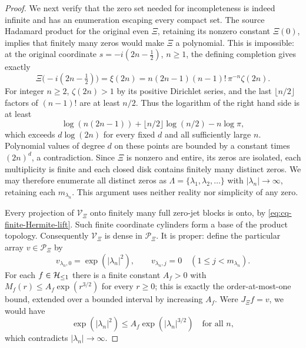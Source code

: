\begin{proof}
We next verify that the zero set needed for incompleteness is
indeed infinite and has an enumeration escaping every compact
set. The source Hadamard product for the original even $\Xi$,
retaining its nonzero constant $\Xi(0)$, implies that finitely
many zeros would make $\Xi$ a polynomial. This is impossible:
at the original coordinate $s=-i(2n-\tfrac12)$, $n\geq1$,
the defining completion gives exactly
\begin{equation}\label{eq:cq-Xi-nonpolynomial-values}
 \Xi\bigl(-i(2n-\tfrac12)\bigr)
 =\xi(2n)=n(2n-1)(n-1)!\,\pi^{-n}\zeta(2n).
\end{equation}
For integer $n\geq2$, $\zeta(2n)>1$ by its positive Dirichlet
series, and the last $\lfloor n/2\rfloor$ factors of $(n-1)!$
are at least $n/2$. Thus the logarithm of the right hand side is
at least
\[
 \log(n(2n-1))+\lfloor n/2\rfloor\log(n/2)-n\log\pi,
\]
which exceeds $d\log(2n)$ for every fixed $d$ and all
sufficiently large $n$. Polynomial values of degree $d$ on these
points are bounded by a constant times $(2n)^d$, a contradiction.
Since $\Xi$ is nonzero and entire, its zeros are isolated, each
multiplicity is finite and each closed disk contains finitely
many distinct zeros. We may therefore enumerate all distinct
zeros as $\Lambda=\{\lambda_1,\lambda_2,\ldots\}$ with
$|\lambda_n|\to\infty$, retaining each $m_{\lambda_n}$.
This argument uses neither reality nor simplicity of any zero.

Every projection of $\mathcal V_\Xi$ onto finitely many full
zero-jet blocks is onto, by \eqref{eq:cq-finite-Hermite-lift}.
Such finite coordinate cylinders form a base of the product
topology. Consequently $\mathcal V_\Xi$ is dense in
$\mathcal P_\Xi$. It is proper: define the particular array
$v\in\mathcal P_\Xi$ by
\begin{equation}\label{eq:cq-nonrealizable-jet-array}
 v_{\lambda_n,0}=\exp(|\lambda_n|^2),\qquad
 v_{\lambda_n,j}=0\quad(1\leq j<m_{\lambda_n}).
\end{equation}
For each $f\in\mathcal H_{\leq 1}$ there is a finite constant $A_f>0$ with
$M_f(r)\leq A_f\exp(r^{3/2})$ for every $r\geq0$; this is
exactly the order-at-most-one bound, extended over a bounded
interval by increasing $A_f$. Were $J_\Xi f=v$, we would have
\[
 \exp(|\lambda_n|^2)
 \leq A_f\exp(|\lambda_n|^{3/2})\quad\text{for all }n,
\]
which contradicts $|\lambda_n|\to\infty$.


\end{proof}
